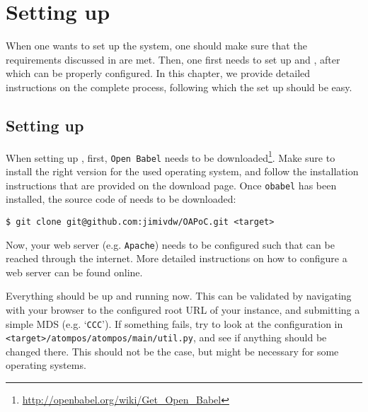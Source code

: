 \chapter{Setting up \oframp}

\lstset{language=sh, frame=single, basicstyle=\ttfamily\small, breaklines=true}

When one wants to set up the \oframp{} system, one should make sure that the requirements discussed in  are met. Then, one first needs to set up \oapoc{} and \omfraf{}, after which \oframp{} can be properly configured. In this chapter, we provide detailed instructions on the complete process, following which the set up should be easy.



\vspace{-.2cm}
\section[\oapoc]{Setting up \oapoc}
\vspace{-.1cm}
When setting up \oapoc, first, \verb|Open Babel| needs to be downloaded\footnote{\url{http://openbabel.org/wiki/Get_Open_Babel}}. Make sure to install the right version for the used operating system, and follow the installation instructions that are provided on the download page. Once \verb|obabel| has been installed, the source code of \oapoc{} needs to be downloaded:
\begin{lstlisting}
$ git clone git@github.com:jimivdw/OAPoC.git <target>
\end{lstlisting}
Now, your web server (e.g. \verb|Apache|) needs to be configured such that \oapoc{} can be reached through the internet. More detailed instructions on how to configure a web server can be found online.

Everything should be up and running now. This can be validated by navigating with your browser to the configured root URL of your \oapoc{} instance, and submitting a simple MDS (e.g. `\texttt{CCC}'). If something fails, try to look at the configuration in \verb|<target>/atompos/atompos/main/util.py|, and see if anything should be changed there. This should not be the case, but might be necessary for some operating systems.



\vspace{-.1cm}
